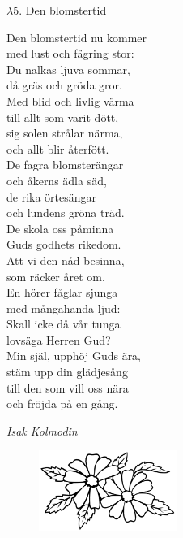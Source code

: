 \documentclass[a6paper,10pt]{article}
\newcommand{\notis}[1]{\begin{flushright}\textit{#1}\end{flushright}}
\begin{document}
\setlength{\oddsidemargin}{-0.37in}
\noindent
\begin{center}
\Large $\lambda5$. Den blomstertid\\
\end{center}
Den blomstertid nu kommer\\
med lust och fägring stor:\\
Du nalkas ljuva sommar,\\
då gräs och gröda gror.\\
Med blid och livlig värma\\
till allt som varit dött,\\
sig solen strålar närma,\\
och allt blir återfött.
\vspace{5pt}\\
De fagra blomsterängar\\
och åkerns ädla säd,\\
de rika örtesängar\\
och lundens gröna träd.\\
De skola oss påminna\\
Guds godhets rikedom.\\
Att vi den nåd besinna,\\
som räcker året om.
\vspace{5pt}\\
En hörer fåglar sjunga\\
med mångahanda ljud:\\
Skall icke då vår tunga\\
lovsäga Herren Gud?\\
Min själ, upphöj Guds ära,\\
stäm upp din glädjesång\\
till den som vill oss nära\\
och fröjda på en gång. 
\notis{Isak Kolmodin}
\vspace{-10pt}
\begin{figure}[!h]
\hspace{30pt}\includegraphics[width=0.4\textwidth]{blommor.png}
\end{figure}
\end{document}
